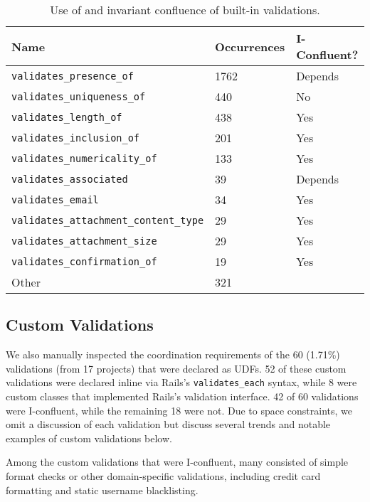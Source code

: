 \begin{table}
\begin{center}
\small
\begin{tabular}{|l l l |}
\hline
Name & Occurrences & I-Confluent?\\\hline
\texttt{validates\_presence\_of} & 1762 & Depends\\
\texttt{validates\_uniqueness\_of} & 440 & No \\
\texttt{validates\_length\_of} & 438 & Yes \\
\texttt{validates\_inclusion\_of} & 201 & Yes\\
\texttt{validates\_numericality\_of} & 133 & Yes \\
\texttt{validates\_associated} & 39 & Depends\\
\texttt{validates\_email} & 34 & Yes \\
\texttt{validates\_attachment\_content\_type} & 29 & Yes \\
\texttt{validates\_attachment\_size} & 29 & Yes \\
\texttt{validates\_confirmation\_of} & 19 & Yes \\
Other & 321 & \\\hline
\end{tabular}
\end{center}\vspace{-1em}
\caption{Use of and invariant confluence of built-in validations.}
\label{table:builtins}
\end{table}

\subsection{Custom Validations}

We also manually inspected the coordination requirements of the 60
(1.71\%) validations (from 17 projects) that were declared as UDFs. 52
of these custom validations were declared inline via Rails's
\texttt{validates\_each} syntax, while 8 were custom classes that
implemented Rails's validation interface. 42 of 60 validations were
I-confluent, while the remaining 18 were not. Due to space
constraints, we omit a discussion of each validation but discuss
several trends and notable examples of custom validations below.

Among the custom validations that were I-confluent, many consisted of
simple format checks or other domain-specific validations, including
credit card formatting and static username blacklisting.

